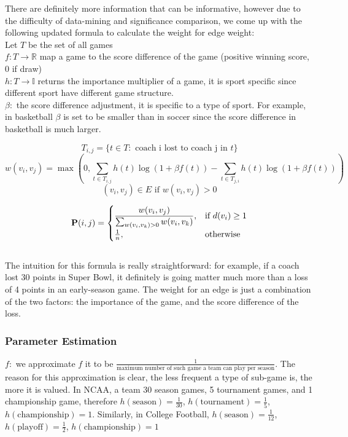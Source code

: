 \documentclass[titlepage]{article}
\begin{document}
\noindent There are definitely more information that can be informative, however due to the difficulty of data-mining and significance comparison, we come up with the following updated formula to calculate the weight for edge weight:
\\

\noindent Let $T$ be the set of all games
\\
$f: T \rightarrow \mathbb{R}$ map a game to the score difference of the game (positive winning score, 0 if draw)
\\
$h: T \rightarrow \mathbb{I}$ returns the importance multiplier of a game, it is sport specific since different sport have different game structure.
\\
$\beta: $ the score difference adjustment, it is specific to a type of sport. For example, in basketball $\beta$ is set to be smaller than in soccer since the score difference in basketball is much larger. 

$$ T_{i,j} = \{t \in T : \mbox{ coach i lost to coach j in } t\} $$
$$w(v_i, v_j) =  \max(0, \sum_{t \in T_{i, j}} h(t) \log(1 + \beta f(t)) - \sum_{t \in T_{j, i}} h(t) \log(1 + \beta f(t))) $$
$$(v_i, v_j) \in E \mbox{ if } w(v_i, v_j) > 0$$

\[
    {\bf P}(i, j)= 
\begin{cases}
    \dfrac{w(v_i, v_j)}{\sum_{w(v_i, v_k) > 0} w(v_i, v_k)},      & \text{if } d(v_i) \geq 1\\
    \frac{1}{n},              & \text{otherwise}
\end{cases}
\]
\\

\noindent The intuition for this formula is really straightforward: for example, if a coach lost 30 points in Super Bowl, it definitely is going matter much more than a loss of 4 points in an early-season game. The weight for an edge is just a combination of the two factors: the importance of the game, and the score difference of the loss.

\subsubsection*{Parameter Estimation}
\noindent $f:$ we approximate $f$ it to be $\frac{1}{\mbox{maximum number of such game a team can play per season}}$. The reason for this approximation is clear, the less frequent a type of sub-game is, the more it is valued. In NCAA, a team 30 season games, 5 tournament games, and 1 championship game, therefore $h(\mbox{season}) = \frac{1}{30}$, $h(\mbox{tournament}) = \frac{1}{5}$, $h(\mbox{championship}) = 1$. Similarly, in College Football, $h(\mbox{season}) = \frac{1}{12}$, $h(\mbox{playoff}) = \frac{1}{2}$, $h(\mbox{championship}) = 1$
\\
\end{document}
